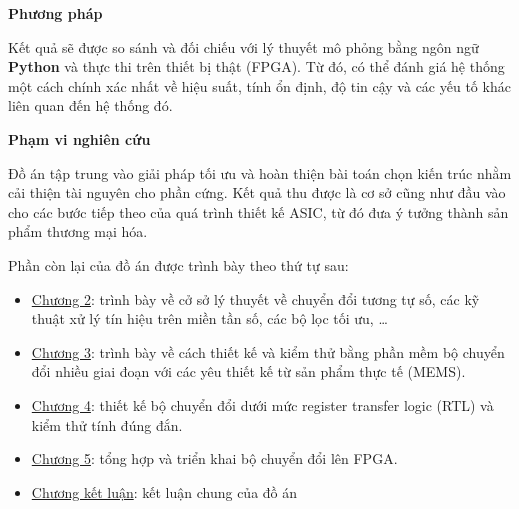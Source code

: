 \noindent \textbf{Phương pháp}

Kết quả sẽ được so sánh và đối chiếu với lý thuyết  mô phỏng bằng ngôn ngữ \textbf{Python} và thực thi trên thiết bị thật (FPGA). Từ đó, có thể đánh giá hệ thống một cách chính xác nhất về hiệu suất, tính ổn định, độ tin cậy và các yếu tố khác liên quan đến hệ thống đó.

\noindent \textbf{Phạm vi nghiên cứu}

Đồ án tập trung vào giải pháp tối ưu và hoàn thiện bài toán chọn kiến trúc nhằm cải thiện tài nguyên cho phần cứng. Kết quả thu được là cơ sở cũng như đầu vào cho các bước tiếp theo của quá trình thiết kế ASIC, từ đó đưa ý tưởng thành sản phẩm thương mại hóa.

\noindent Phần còn lại của đồ án được trình bày theo thứ tự sau:
\begin{itemize}
    \item \hyperref[chuong2]{Chương 2}: trình bày về cở sở lý thuyết về chuyển đổi tương tự số, các kỹ thuật xử lý tín hiệu trên miền tần số, các bộ lọc tối ưu, \ldots
    \item \hyperref[chuong3]{Chương 3}: trình bày về cách thiết kế và kiểm thử bằng phần mềm bộ chuyển đổi nhiều giai đoạn với các yêu thiết kế từ sản phẩm thực tế (MEMS).
    \item \hyperref[chuong4]{Chương 4}: thiết kế bộ chuyển đổi dưới mức register transfer logic (RTL) và kiểm thử tính đúng đắn.
    \item \hyperref[chuong5]{Chương 5}: tổng hợp và triển khai bộ chuyển đổi lên FPGA.
    \item \hyperref[ketluan]{Chương kết luận}: kết luận chung của đồ án
\end{itemize}
\newpage